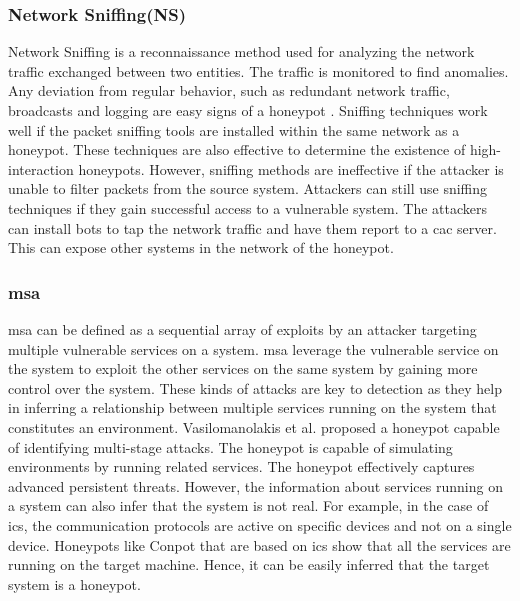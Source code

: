 \subsubsection{Network Sniffing(NS)}
Network Sniffing is a reconnaissance method used for analyzing the network traffic exchanged between two entities. The traffic is monitored to find anomalies. Any deviation from regular behavior, such as redundant network traffic, broadcasts and logging are easy signs of a honeypot . Sniffing techniques work well if the packet sniffing tools are installed within the same network as a honeypot. These techniques are also effective to determine the existence of high-interaction honeypots. However, sniffing methods are ineffective if the attacker is unable to filter packets from the source system. Attackers can still use sniffing techniques if they gain successful access to a vulnerable system. The attackers can install bots to tap the network traffic and have them report to a \acrshort{cac}  server. This can expose other systems in the network of the honeypot. 

\subsubsection{\acrfull{msa}}
\acrlong{msa} can be defined as a sequential array of exploits by an attacker targeting multiple vulnerable services on a system. \acrshort{msa} leverage the vulnerable service on the system to exploit the other services on the same system by gaining more control over the system. These kinds of attacks are key to detection as they help in inferring a relationship between multiple services running on the system that constitutes an environment. Vasilomanolakis et al. \cite{vasilomanolakis} proposed a honeypot capable of identifying multi-stage attacks. The honeypot is capable of simulating environments by running related services. The honeypot effectively captures advanced persistent threats. However, the information about services running on a system can also infer that the system is not real. For example, in the case of \acrshort{ics}, the communication protocols are active on specific devices and not on a single device. Honeypots like Conpot that are based on \acrshort{ics} show that all the services are running on the target machine. Hence, it can be easily inferred that the target system is a honeypot. 

